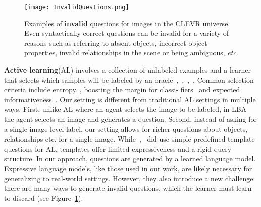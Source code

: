 \documentclass[10pt,twocolumn,letterpaper]{article}
\begin{document}
\begin{figure}[!htb]
\begin{center}
   \texttt{[image: InvalidQuestions.png]}
\end{center}
   \caption{Examples of \textbf{invalid} questions for images in the
CLEVR universe. Even syntactically correct questions can
be invalid for a variety of reasons such as referring to absent
objects, incorrect object properties, invalid relationships in
the scene or being ambiguous, \emph{etc}.}
\label{fig:questions}
\end{figure}

\textbf{Active learning}(AL) involves a collection of unlabeled
examples and a learner that selects which samples will be
labeled by an oracle~\cite{Kapoor2007Active},~\cite{Li2013Adaptive},~\cite{settles2009active},~\cite{Vijayanarasimhan2014Large}. Common selection
criteria include entropy~\cite{Joshi2009Multi}, boosting the margin for classi-
fiers~\cite{Collins2008Towards} and expected informativeness~\cite{Neil2011Bayesian}. Our setting
is different from traditional AL settings in multiple ways.
First, unlike AL where an agent selects the image to be labeled,
in LBA the agent selects an image and generates a
question. Second, instead of asking for a single image level
label, our setting allows for richer questions about objects,
relationships etc. for a single image. While~\cite{Choi2016Knowledge},~\cite{Siddiquie2010Beyond} did
use simple predefined template questions for AL, templates
offer limited expressiveness and a rigid query structure. In
our approach, questions are generated by a learned language
model. Expressive language models, like those used in our
work, are likely necessary for generalizing to real-world
settings. However, they also introduce a new challenge:
there are many ways to generate invalid questions, which
the learner must learn to discard (see Figure~\ref{fig:questions}).


{\small


}
\end{document}
